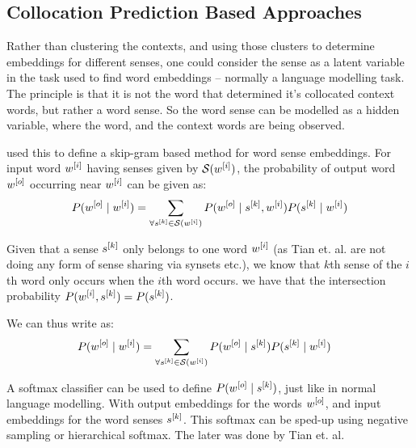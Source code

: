 \documentclass[12pt,parskip]{komatufte}
\begin{document}
\subsection{Collocation Prediction Based Approaches}
Rather than clustering the contexts, and using those clusters to determine embeddings for different senses, one could consider the sense as a latent variable in the task used to find word embeddings -- normally a language modelling task.
The principle is that it is not the word that determined it's collocated context words,
but rather a word sense.
So the word sense can be modelled as a hidden variable, where the word, and the context words are being observed.

 used this to define a  skip-gram based method for word sense embeddings.
For input word $\n w_i$ having senses given by $\seq S(\n w_i)$,
the probability of output word $\n w_o$ occurring near $\n w_i$ can be given as:
\begin{equation}
	P(\n w_o\mid \n w_i) = \sum_{\forall \n s_k \in \seq S(\n w_i)} P(\n w_o \mid \n s_k, \n w_i) P(\n s_k \mid \n w_i) \label{equ:tianmm}
\end{equation}

Given that a sense $\n s_k$ only belongs to one word $\n w_i$ (as Tian et. al. are not doing any form of sense sharing via synsets etc.),
we know that $k$th sense of the $i$th word only occurs when the $i$th word occurs.
we have that the intersection probability $P(\n w_i,\n s_k) = P(\n s_k)$.

We can thus write  as:
\begin{align}
P(\n w_o\mid \n w_i) &= \sum_{\forall \n s_k \in \seq S(\n w_i)} P(\n w_o \mid \n s_k) P(\n s_k \mid \n w_i) \label{equ:tianmm2}
\end{align}

A softmax classifier can be used to define $P(\n w_o \mid \n s_k)$, just like in normal language modelling.
With output embeddings for the words $\n w_o$, and input embeddings for the word senses $\n s_k$.
This softmax can be sped-up using negative sampling or hierarchical softmax.
The later was done by Tian et. al.
\end{document}

